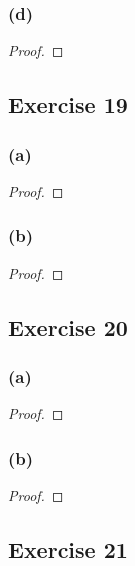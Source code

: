 \documentclass[14pt]{extarticle}
\begin{document}
\subsubsection{(d)}

\begin{proof}

\end{proof}

\subsection{Exercise 19}

\subsubsection{(a)}

\begin{proof}

\end{proof}

\subsubsection{(b)}

\begin{proof}

\end{proof}

\subsection{Exercise 20}

\subsubsection{(a)}

\begin{proof}

\end{proof}

\subsubsection{(b)}

\begin{proof}

\end{proof}

\subsection{Exercise 21}
\end{document}
